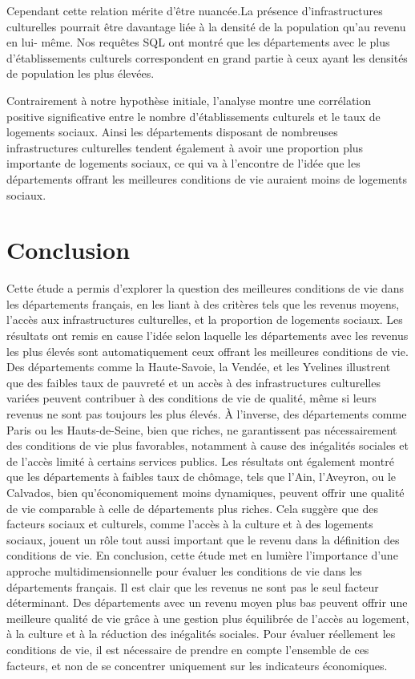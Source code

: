 \documentclass[mstat,12pt]{unswthesis}
\begin{document}
\medskip

Cependant cette relation mérite d'être nuancée.La présence
d'infrastructures culturelles pourrait être davantage liée à la densité
de la population qu'au revenu en lui- même. Nos requêtes SQL ont montré
que les départements avec le plus d'établissements culturels
correspondent en grand partie à ceux ayant les densités de population
les plus élevées.

\medskip

Contrairement à notre hypothèse initiale, l'analyse montre une
corrélation positive significative entre le nombre d'établissements
culturels et le taux de logements sociaux. Ainsi les départements
disposant de nombreuses infrastructures culturelles tendent également à
avoir une proportion plus importante de logements sociaux, ce qui va à
l'encontre de l'idée que les départements offrant les meilleures
conditions de vie auraient moins de logements sociaux.

\bigskip

\chapter{Conclusion}\label{conclusion}

Cette étude a permis d'explorer la question des meilleures conditions de
vie dans les départements français, en les liant à des critères tels que
les revenus moyens, l'accès aux infrastructures culturelles, et la
proportion de logements sociaux. Les résultats ont remis en cause l'idée
selon laquelle les départements avec les revenus les plus élevés sont
automatiquement ceux offrant les meilleures conditions de vie. \medskip
Des départements comme la Haute-Savoie, la Vendée, et les Yvelines
illustrent que des faibles taux de pauvreté et un accès à des
infrastructures culturelles variées peuvent contribuer à des conditions
de vie de qualité, même si leurs revenus ne sont pas toujours les plus
élevés. À l'inverse, des départements comme Paris ou les Hauts-de-Seine,
bien que riches, ne garantissent pas nécessairement des conditions de
vie plus favorables, notamment à cause des inégalités sociales et de
l'accès limité à certains services publics. \medskip Les résultats ont
également montré que les départements à faibles taux de chômage, tels
que l'Ain, l'Aveyron, ou le Calvados, bien qu'économiquement moins
dynamiques, peuvent offrir une qualité de vie comparable à celle de
départements plus riches. Cela suggère que des facteurs sociaux et
culturels, comme l'accès à la culture et à des logements sociaux, jouent
un rôle tout aussi important que le revenu dans la définition des
conditions de vie. \medskip En conclusion, cette étude met en lumière
l'importance d'une approche multidimensionnelle pour évaluer les
conditions de vie dans les départements français. Il est clair que les
revenus ne sont pas le seul facteur déterminant. Des départements avec
un revenu moyen plus bas peuvent offrir une meilleure qualité de vie
grâce à une gestion plus équilibrée de l'accès au logement, à la culture
et à la réduction des inégalités sociales. Pour évaluer réellement les
conditions de vie, il est nécessaire de prendre en compte l'ensemble de
ces facteurs, et non de se concentrer uniquement sur les indicateurs
économiques. \bigskip
\end{document}

